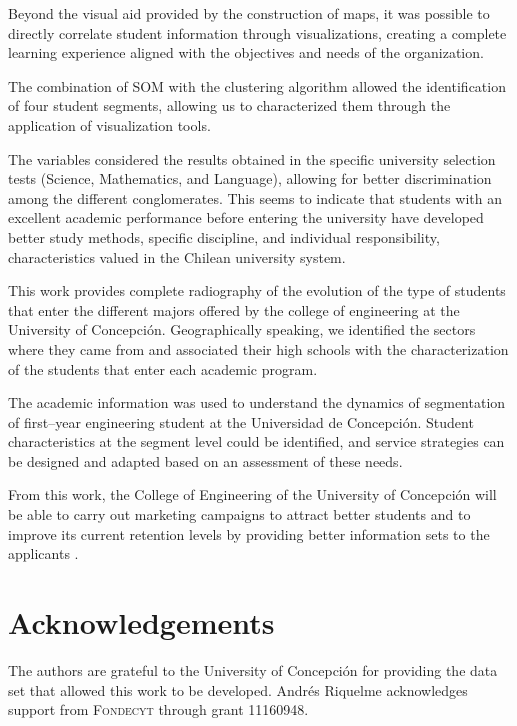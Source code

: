 \documentclass[5p,authoryear,preprint,12pt]{elsarticle}
\begin{document}
Beyond the visual aid provided by the construction of maps, it was possible to directly correlate student information through visualizations, creating a complete learning experience aligned with the objectives and needs of the organization. 

The combination of SOM with the clustering algorithm allowed the identification of four student segments, allowing us to characterized them through the application of visualization tools.

The variables considered the results obtained in the specific university selection tests (Science, Mathematics, and Language), allowing for better discrimination among the different conglomerates. This seems to indicate that students with an excellent academic performance before entering the university have developed better study methods, specific discipline, and individual responsibility, characteristics valued in the Chilean university system.  

This work provides complete radiography of the evolution of the type of students that enter the different majors offered by the college of engineering at the University of Concepci\'on. Geographically speaking, we identified the sectors where they came from and associated their high schools with the characterization of the students that enter each academic program.

The academic information was used to understand the dynamics of segmentation of first--year engineering student at the Universidad de Concepción. Student characteristics at the segment level could be identified, and service strategies can be designed and adapted based on an assessment of these needs.

From this work, the College of Engineering of the University of Concepci\'on will be able to carry out marketing campaigns to attract better students and to improve its current retention levels by providing better information sets to the applicants \citep{chingos2012}.

\section{Acknowledgements}
The authors are grateful to the University of Concepción for providing the data set that allowed this work to be developed. Andr\'es Riquelme acknowledges support from \textsc{Fondecyt} through grant 11160948.
\end{document}
